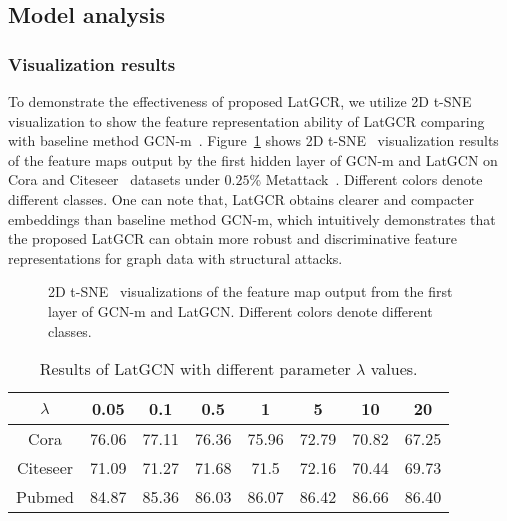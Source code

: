 \documentclass{article}
\begin{document}
\subsection{Model analysis}

\subsubsection{Visualization results}

To demonstrate the effectiveness of proposed LatGCR, we utilize 2D t-SNE~\cite{tsne} visualization to show the feature representation ability of LatGCR comparing with baseline method GCN-m~\cite{graphsage,kipf2016semi}.
Figure~\ref{fig:demo} shows 2D t-SNE~\cite{tsne} visualization results of the feature maps output by the first hidden layer of GCN-m and LatGCN on Cora and  Citeseer~\cite{sen2008collective,prognn} datasets under $0.25$\% Metattack~\cite{mettack}. Different colors denote different classes.
One can note that, LatGCR obtains clearer and compacter embeddings than baseline method GCN-m, which intuitively demonstrates that the proposed LatGCR can obtain more robust and discriminative feature representations for graph data with structural attacks.

\begin{figure}[htpb]
\centering
{}
\caption{2D t-SNE~\cite{tsne} visualizations of the feature map output from the first layer of GCN-m and LatGCN. Different colors denote different classes.}
\label{fig:demo}
\end{figure}
\begin{table}[!htpb]
\centering
\caption{\upshape Results of LatGCN with different parameter $\lambda$ values.}
\label{tab:lambda}
\renewcommand\arraystretch{1.3}
\begin{tabular}{c|ccccccc}
  \hline
  \hline
  $\lambda$  & 0.05 & 0.1& 0.5 & 1   &5    &   10&20\\
  \hline
   Cora      &76.06&77.11&76.36&75.96&72.79&70.82&67.25 \\
   Citeseer  &71.09&71.27&71.68&71.5&72.16&70.44&69.73\\
   Pubmed    &84.87&85.36&86.03&86.07&86.42&86.66&86.40 \\
  \hline
  \hline
\end{tabular}
\end{table}
\end{document}
